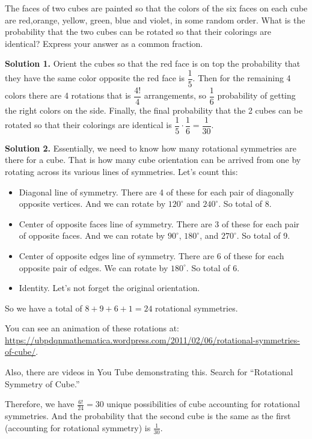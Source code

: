 \documentclass[11pt,twoside]{scrartcl}
\begin{document}
\begin{problem}
    The faces of two cubes are painted so that the colors of the six faces on each cube are red,orange, yellow, green, blue and violet, in some random order. What is the probability that the two cubes can be rotated so that their colorings are identical? Express your answer as a common fraction.
    \begin{sketch}
        \textbf{Solution 1. }
        Orient the cubes so that the red face is on top the probability that they have the same color opposite the red face is $\dfrac{1}{5}$. Then for the remaining 4 colors there are 4 rotations that is ${\dfrac{4!}{4}}$ arrangements, so $\dfrac{1}{6}$ probability of getting the right colors on the side. Finally, the final probability that the 2 cubes can be rotated so that their colorings are identical is $\dfrac{1}{5}\cdot\dfrac{1}{6} = \dfrac{1}{30}.$

        \textbf{Solution 2. }
        Essentially, we need to know how many rotational symmetries are there for a cube. That is how many cube orientation can be arrived from one by rotating across its various lines of symmetries. Let's count this:
        \begin{itemize}
            \item Diagonal line of symmetry. There are 4 of these for each pair of diagonally opposite vertices. And we can rotate by $120^\circ$ and $240^\circ$. So total of 8.
            \item Center of opposite faces line of symmetry. There are 3 of these for each pair of opposite faces. And we can rotate by $90^\circ$, $180^\circ$, and $270^\circ$. So total of 9.
            \item Center of opposite edges line of symmetry. There are 6 of these for each opposite pair of edges. We can rotate by $180^\circ$. So total of 6.
            \item Identity. Let's not forget the original orientation.   
        \end{itemize}
        So we have a total of $8 + 9 + 6 + 1 = 24$ rotational symmetries.
\begin{remark}
    You can see an animation of these rotations at: \\
    \url{https://ubpdqnmathematica.wordpress.com/2011/02/06/rotational-symmetries-of-cube/}.

    Also, there are videos in You Tube demonstrating this. Search for ``Rotational Symmetry of Cube.''
\end{remark}        
    Therefore, we have $\frac{6!}{24} = 30$ unique possibilities of cube accounting for rotational symmetries. And the probability that the second cube is the same as the first (accounting for rotational symmetry) is 
        $\boxed{\frac{1}{30}}$.
    \end{sketch}
\end{problem}
\end{document}
